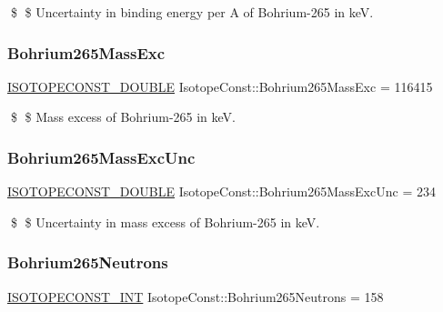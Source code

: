 \$ \$ Uncertainty in binding energy per A of Bohrium-\/265 in keV. \mbox{\label{group___isotope_const-_bohrium-_bh265_gaa8df36fc6df7798da36647f00e75e03f}} 
\subsubsection{\texorpdfstring{Bohrium265\+Mass\+Exc}{Bohrium265MassExc}}
{\footnotesize\ttfamily \mbox{\hyperlink{group___isotope_const-_macros_ga8f45a7272ce02c0b4c65c44636ed719a}{I\+S\+O\+T\+O\+P\+E\+C\+O\+N\+S\+T\+\_\+\+D\+O\+U\+B\+LE}} Isotope\+Const\+::\+Bohrium265\+Mass\+Exc = 116415}

\$ \$ Mass excess of Bohrium-\/265 in keV. \mbox{\label{group___isotope_const-_bohrium-_bh265_ga1b90c68ce65e9d665df3ce05ff41790f}} 
\subsubsection{\texorpdfstring{Bohrium265\+Mass\+Exc\+Unc}{Bohrium265MassExcUnc}}
{\footnotesize\ttfamily \mbox{\hyperlink{group___isotope_const-_macros_ga8f45a7272ce02c0b4c65c44636ed719a}{I\+S\+O\+T\+O\+P\+E\+C\+O\+N\+S\+T\+\_\+\+D\+O\+U\+B\+LE}} Isotope\+Const\+::\+Bohrium265\+Mass\+Exc\+Unc = 234}

\$ \$ Uncertainty in mass excess of Bohrium-\/265 in keV. \mbox{\label{group___isotope_const-_bohrium-_bh265_gaf50b8b815ba935465d4228d84de09acb}} 
\subsubsection{\texorpdfstring{Bohrium265\+Neutrons}{Bohrium265Neutrons}}
{\footnotesize\ttfamily \mbox{\hyperlink{group___isotope_const-_macros_ga5f18360b3e99483a35c32d789e62621c}{I\+S\+O\+T\+O\+P\+E\+C\+O\+N\+S\+T\+\_\+\+I\+NT}} Isotope\+Const\+::\+Bohrium265\+Neutrons = 158}

